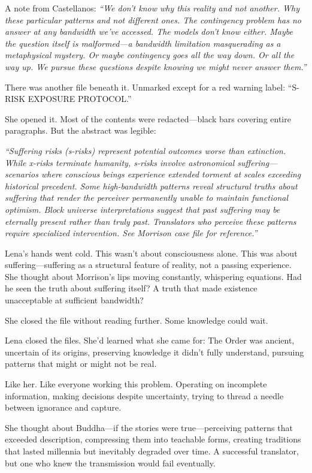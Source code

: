 A note from Castellanos: \textit{``We don't know why this reality and not another. Why these particular patterns and not different ones. The contingency problem has no answer at any bandwidth we've accessed. The models don't know either. Maybe the question itself is malformed—a bandwidth limitation masquerading as a metaphysical mystery. Or maybe contingency goes all the way down. Or all the way up. We pursue these questions despite knowing we might never answer them.''}

There was another file beneath it. Unmarked except for a red warning label: ``S-RISK EXPOSURE PROTOCOL.''

She opened it. Most of the contents were redacted—black bars covering entire paragraphs. But the abstract was legible:

\textit{``Suffering risks (s-risks) represent potential outcomes worse than extinction. While x-risks terminate humanity, s-risks involve astronomical suffering—scenarios where conscious beings experience extended torment at scales exceeding historical precedent. Some high-bandwidth patterns reveal structural truths about suffering that render the perceiver permanently unable to maintain functional optimism. Block universe interpretations suggest that past suffering may be eternally present rather than truly past. Translators who perceive these patterns require specialized intervention. See Morrison case file for reference.''}

Lena's hands went cold. This wasn't about consciousness alone. This was about suffering—suffering as a structural feature of reality, not a passing experience. She thought about Morrison's lips moving constantly, whispering equations. Had he seen the truth about suffering itself? A truth that made existence unacceptable at sufficient bandwidth?

She closed the file without reading further. Some knowledge could wait.

Lena closed the files. She'd learned what she came for: The Order was ancient, uncertain of its origins, preserving knowledge it didn't fully understand, pursuing patterns that might or might not be real.

Like her. Like everyone working this problem. Operating on incomplete information, making decisions despite uncertainty, trying to thread a needle between ignorance and capture.

She thought about Buddha—if the stories were true—perceiving patterns that exceeded description, compressing them into teachable forms, creating traditions that lasted millennia but inevitably degraded over time. A successful translator, but one who knew the transmission would fail eventually.

